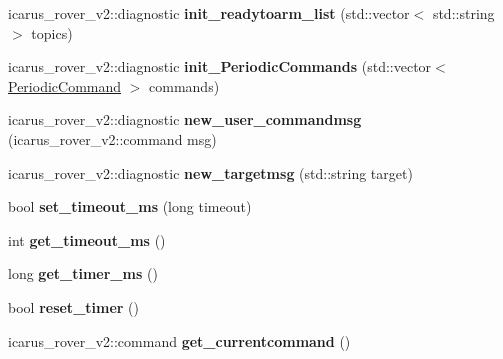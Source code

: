 \begin{DoxyCompactItemize}
\mbox{\label{classCommandNodeProcess_a2bd4d2fb35fe07ac02b0c515b91696ab}} 
icarus\+\_\+rover\+\_\+v2\+::diagnostic {\bfseries init\+\_\+readytoarm\+\_\+list} (std\+::vector$<$ std\+::string $>$ topics)
\item 
\mbox{\label{classCommandNodeProcess_af62e447c4ca2685a287881ad17d98a5f}} 
icarus\+\_\+rover\+\_\+v2\+::diagnostic {\bfseries init\+\_\+\+Periodic\+Commands} (std\+::vector$<$ \hyperlink{structPeriodicCommand}{Periodic\+Command} $>$ commands)
\item 
\mbox{\label{classCommandNodeProcess_ab5cf146bf897e442a9fa6f166f1df449}} 
icarus\+\_\+rover\+\_\+v2\+::diagnostic {\bfseries new\+\_\+user\+\_\+commandmsg} (icarus\+\_\+rover\+\_\+v2\+::command msg)
\item 
\mbox{\label{classCommandNodeProcess_a0cc7367204c9fe2443a37400726a5af3}} 
icarus\+\_\+rover\+\_\+v2\+::diagnostic {\bfseries new\+\_\+targetmsg} (std\+::string target)
\item 
\mbox{\label{classCommandNodeProcess_afdef1e1e227ce89d0cb101a026597e91}} 
bool {\bfseries set\+\_\+timeout\+\_\+ms} (long timeout)
\item 
\mbox{\label{classCommandNodeProcess_a680ca0f452f02f3ff49144705dc4ce2d}} 
int {\bfseries get\+\_\+timeout\+\_\+ms} ()
\item 
\mbox{\label{classCommandNodeProcess_aa170955292a5d4cb5fe1d5aae8339ad8}} 
long {\bfseries get\+\_\+timer\+\_\+ms} ()
\item 
\mbox{\label{classCommandNodeProcess_ad74166ba9f2122aca5db2d75f220d6d4}} 
bool {\bfseries reset\+\_\+timer} ()
\item 
\mbox{\label{classCommandNodeProcess_a36f88d272c9ecbf45f779fd71e1d5dfb}} 
icarus\+\_\+rover\+\_\+v2\+::command {\bfseries get\+\_\+currentcommand} ()
\item 
\mbox{\label{classCommandNodeProcess_a8ed87d91c194bf1922e154371b00ade3}} 

\end{DoxyCompactItemize}
